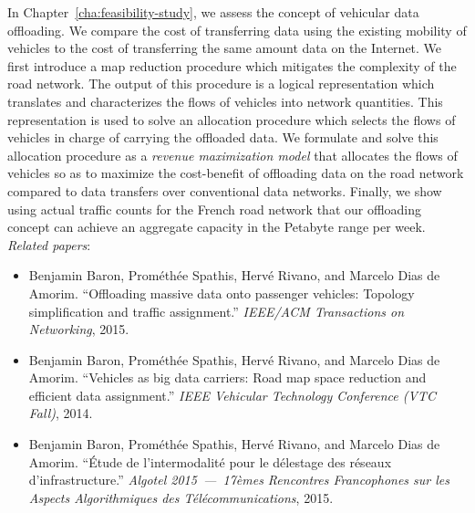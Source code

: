 In Chapter~\ref{cha:feasibility-study}, we assess the concept of vehicular data offloading. We compare the cost of transferring data using the existing mobility of vehicles to the cost of transferring the same amount data on the Internet. We first introduce a map reduction procedure which mitigates the complexity of the road network. The output of this procedure is a logical representation which translates and characterizes the flows of vehicles into network quantities. This representation is used to solve an allocation procedure which selects the flows of vehicles in charge of carrying the offloaded data. We formulate and solve this allocation procedure as a \textit{revenue maximization model} that allocates the flows of vehicles so as to maximize the cost-benefit of offloading data on the road network compared to data transfers over conventional data networks.
Finally, we show using actual traffic counts for the French road network that our offloading concept can achieve an aggregate capacity in the Petabyte range per week.\\[3pt]
\textit{Related papers}:
\begin{itemize}
    \item Benjamin Baron, Prométhée Spathis, Hervé Rivano, and Marcelo Dias de Amorim. ``Offloading massive data onto passenger vehicles: Topology simplification and traffic assignment.'' \textit{IEEE/ACM Transactions on Networking}, 2015.
    \item Benjamin Baron, Prométhée Spathis, Hervé Rivano, and Marcelo Dias de Amorim. ``Vehicles as big data carriers: Road map space reduction and efficient data assignment.'' \textit{IEEE Vehicular Technology Conference (VTC Fall)}, 2014.
    \item Benjamin Baron, Prométhée Spathis, Hervé Rivano, and Marcelo Dias de Amorim. ``Étude de l'intermodalité pour le délestage des réseaux d'infrastructure.'' \textit{Algotel 2015~---~17èmes Rencontres Francophones sur les Aspects Algorithmiques des Télécommunications}, 2015.
\end{itemize}



